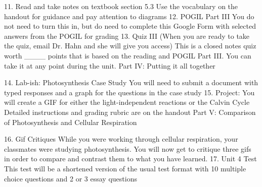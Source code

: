 	11. Read and take notes on textbook section 5.3
	Use the vocabulary on the handout for guidance and pay attention to diagrams
	12. POGIL Part III
	You do not need to turn this in, but do need to complete this Google Form with selected answers from the POGIL for grading
	13. Quiz III (When you are ready to take the quiz, email Dr. Hahn and she will give you access)
	This is a closed notes quiz worth ____ points that is based on the reading and POGIL Part III. You can take it at any point during the unit.
	Part IV: Putting it all together
	

	14. Lab-ish: Photosynthesis Case Study
	You will need to submit a document with typed responses and a graph for the questions in the case study
	15. Project: You will create a GIF for either the light-independent reactions or the Calvin Cycle
	Detailed instructions and grading rubric are on the handout
	Part V: Comparison of Photosynthesis and Cellular Respiration
	

	16. Gif Critiques
	While you were working through cellular respiration, your classmates were studying photosynthesis. You will now get to critique three gifs in order to compare and contrast them to what you have learned.
	17. Unit 4 Test
	This test will be a shortened version of the usual test format with 10 multiple choice questions and 2 or 3 essay questions